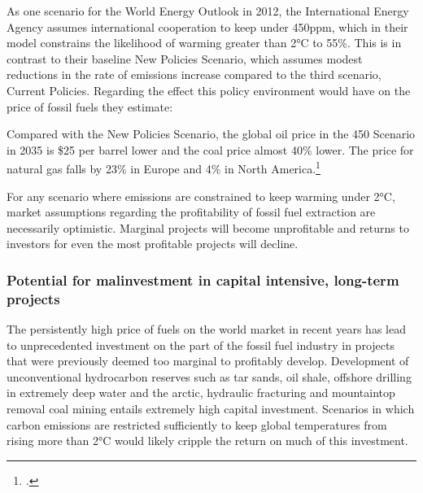 As one scenario for the World Energy Outlook in 2012, the International Energy Agency assumes international cooperation to keep  under 450ppm, which in their model constrains the likelihood of warming greater than 2°C to 55\%. 
This is in contrast to their baseline New Policies Scenario, which assumes modest reductions in the rate of emissions increase compared to the third scenario, Current Policies. 
Regarding the effect this policy environment would have on the price of fossil fuels they estimate:
\begin{slquote}Compared with the New Policies Scenario, the global oil price in the 450 Scenario in 2035 is \$25 per barrel lower and the coal price almost 40\% lower. The price for natural gas falls by 23\% in Europe and 4\% in North America.\footcite[][p. 257]{IEA2012}
\end{slquote}



For any scenario where emissions are constrained to keep warming under 2°C, market assumptions regarding the profitability of fossil fuel extraction are necessarily optimistic. 
Marginal projects will become unprofitable and returns to investors for even the most profitable projects will decline. 


\subsubsection {Potential for malinvestment in capital intensive, long-term projects}



The persistently high price of fuels on the world market in recent years has lead to unprecedented investment on the part of the fossil fuel industry in projects that were previously deemed too marginal to profitably develop. 
Development of unconventional hydrocarbon reserves such as tar sands, oil shale, offshore drilling in extremely deep water and the arctic, hydraulic fracturing and mountaintop removal coal mining entails extremely high capital investment. 
Scenarios in which carbon emissions are restricted sufficiently to keep global temperatures from rising more than 2°C would likely cripple the return on much of this investment.

